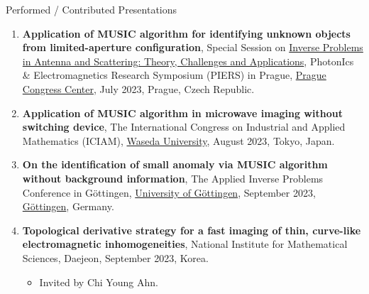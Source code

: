 \documentclass{resume} %
\begin{document}
\begin{rSection}{Performed / Contributed Presentations}
\begin{enumerate}
\item\label{P-PIERS2023} \textbf{Application of MUSIC algorithm for identifying unknown objects from limited-aperture configuration}, Special Session on \href{https://prague2023.piers.org/session.html?sid=S093}{Inverse Problems in Antenna and Scattering: Theory, Challenges and Applications}, PhotonIcs \& Electromagnetics Research Symposium (PIERS) in Prague, \href{https://www.praguecc.cz/en/homepage}{Prague Congress Center}, July 2023, Prague, Czech Republic.
\item\label{P-ICIAM2023} \textbf{Application of MUSIC algorithm in microwave imaging without switching device}, The  International Congress on Industrial and Applied Mathematics (ICIAM), \href{https://www.waseda.jp/top/en/}{Waseda University}, August 2023, Tokyo, Japan.
\item\label{P-AIP2023} \textbf{On the identification of small anomaly via MUSIC algorithm without background information}, The  Applied Inverse Problems Conference in G\"ottingen, \href{https://www.uni-goettingen.de}{University of G\"ottingen}, September 2023, \href{https://www.goettingen-tourismus.de}{G\"ottingen}, Germany.
\item\label{P-NIMS2023B} \textbf{Topological derivative strategy for a fast imaging of thin, curve-like electromagnetic inhomogeneities}, National Institute for Mathematical Sciences, Daejeon, September 2023, Korea.
    \begin{itemize}
\item Invited by Chi Young Ahn.
\end{itemize}
\end{enumerate}
\end{rSection}
\end{document}
